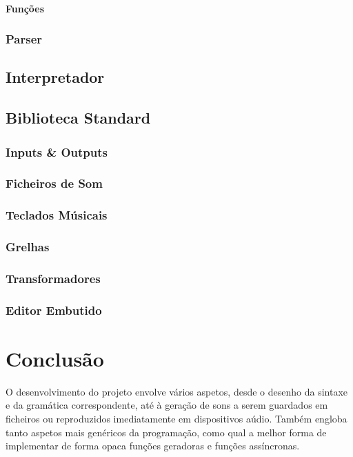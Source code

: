 \documentclass[
  oneside,
  11pt, a4paper,
  footinclude=true,
  headinclude=true,
  cleardoublepage=empty
]{scrbook}
\begin{document}
	\subsubsection{\textbf{Funções}}
	
	\subsection{Parser}
	\section{Interpretador}
	\section{Biblioteca Standard}
	\subsection{Inputs \& Outputs}
	\subsection{Ficheiros de Som}
	\subsection{Teclados Músicais}
	\subsection{Grelhas}
	\subsection{Transformadores}
	\subsection{Editor Embutido}
	

	\chapter{Conclusão}
	O desenvolvimento do projeto envolve vários aspetos, desde o desenho da sintaxe e da gramática correspondente, até à geração de sons a serem guardados em ficheiros ou reproduzidos imediatamente em dispositivos aúdio. Também engloba tanto aspetos mais genéricos da programação, como qual a melhor forma de implementar de forma opaca funções geradoras e funções assíncronas.
	
\end{document}

